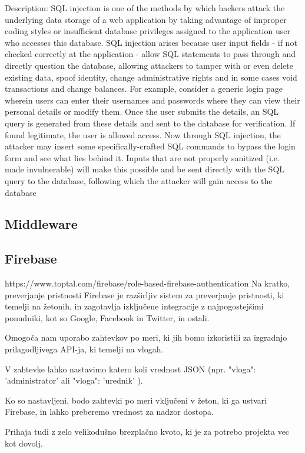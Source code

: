 \documentclass[a4paper, 12pt]{book}
\begin{document}
Description: SQL injection is one of the methods by which hackers attack the underlying data storage of a web application by taking advantage of improper coding styles or insufficient database privileges assigned to the application user who accesses this database. SQL injection arises because user input fields - if not checked correctly at the application - allow SQL statements to pass through and directly question the database, allowing attackers to tamper with or even delete existing data, spoof identity, change administrative rights and in some cases void transactions and change balances. For example, consider a generic login page wherein users can enter their usernames and passwords where they can view their personal details or modify them. Once the user submits the details, an SQL query is generated from these details and sent to the database for verification. If found legitimate, the user is allowed access. Now through SQL injection, the attacker may insert some specifically-crafted SQL commands to bypass the login form and see what lies behind it. Inputs that are not properly sanitized (i.e. made invulnerable) will make this possible and be sent directly with the SQL query to the database, following which the attacker will gain access to the database

\subsection{Middleware}

\subsection{Firebase}
https://www.toptal.com/firebase/role-based-firebase-authentication
Na kratko, preverjanje pristnosti Firebase je razširljiv sistem za preverjanje pristnosti, ki temelji na žetonih, in zagotavlja izključene integracije z najpogostejšimi ponudniki, kot so Google, Facebook in Twitter, in ostali.

Omogoča nam uporabo zahtevkov po meri, ki jih bomo izkoristili za izgradnjo prilagodljivega API-ja, ki temelji na vlogah.

V zahtevke lahko nastavimo katero koli vrednost JSON (npr. { "vloga": 'administrator' } ali { "vloga": 'urednik' }).

Ko so nastavljeni, bodo zahtevki po meri vključeni v žeton, ki ga ustvari Firebase, in lahko preberemo vrednost za nadzor dostopa.

Prihaja tudi z zelo velikodušno brezplačno kvoto, ki je za potrebo projekta vec kot dovolj.
\end{document}
